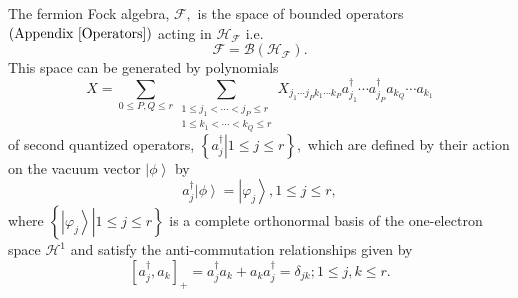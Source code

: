 \documentclass[aps,preprint]{revtex4}%
\begin{document}
The fermion Fock algebra, $\mathcal{F},$ is the space of bounded operators
$\left(  \text{Appendix \ref{Operators}}\right)  $ acting in $\mathcal{H}%
_{\mathcal{F}}$ i.e.
\begin{equation}
\mathcal{F}=\mathcal{B}\left(  \mathcal{H}_{\mathcal{F}}\right)  .
\end{equation}
This space can be generated by polynomials
\begin{equation}
X=\sum_{0\leq P,Q\leq r}\sum_{\substack{1\leq j_{1}<\cdots<j_{P}\leq r\\1\leq
k_{1}<\cdots<k_{Q}\leq r}}X_{j_{1}\cdots j_{P}k_{1}\cdots k_{P}}a_{j_{1}%
}^{\dagger}\cdots a_{j_{P}}^{\dagger}a_{k_{Q}}\cdots a_{k_{1}}%
\end{equation}
of second quantized operators, $\left\{  \left.  a_{j}^{\dagger}\right\vert
1\leq j\leq r\right\}  ,$ which are defined by their action on the vacuum
vector $\left\vert \phi\right\rangle $ by
\begin{equation}
a_{j}^{\dagger}\left\vert \phi\right\rangle =\left\vert \varphi_{j}%
\right\rangle ,1\leq j\leq r,
\end{equation}
where $\left\{  \left.  \left\vert \varphi_{j}\right\rangle \right\vert 1\leq
j\leq r\right\}  $ is a complete orthonormal basis of the one-electron space
$\mathcal{H}^{1}$ and satisfy the anti-commutation relationships given by
\begin{equation}
\left[  a_{j}^{\dagger},a_{k}\right]  _{+}=a_{j}^{\dagger}a_{k}+a_{k}%
a_{j}^{\dagger}=\delta_{jk};1\leq j,k\leq r. \label{CAR}%
\end{equation}
\end{document}
